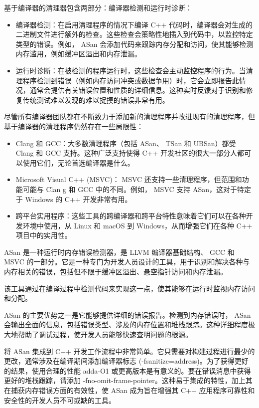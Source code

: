 基于编译器的清理器包含两部分：编译器检测和运行时诊断：

\begin{itemize}
\item
编译器检测：在启用清理程序的情况下编译 C++ 代码时，编译器会对生成的二进制文件进行额外的检查。这些检查会策略性地插入到代码中，以监控特定类型的错误。例如， ASan 会添加代码来跟踪内存分配和访问，使其能够检测内存滥用，例如缓冲区溢出和内存泄漏。

\item
运行时诊断：在被检测的程序运行时，这些检查会主动监控程序的行为。当清理程序检测到错误（例如内存访问冲突或数据争用）时，它会立即报告此情况，通常会提供有关错误位置和性质的详细信息。这种实时反馈对于识别和修复传统测试难以发现的难以捉摸的错误非常有用。
\end{itemize}

尽管所有编译器团队都在不断致力于添加新的清理程序并改进现有的清理程序，但基于编译器的清理程序仍然存在一些局限性：

\begin{itemize}
\item
Clang 和 GCC：大多数清理程序（包括 ASan、 TSan 和 UBSan）都受 Clang 和 GCC 支持。这种广泛支持使得 C++ 开发社区的很大一部分人都可以使用它们，无论首选编译器是什么。

\item
Microsoft Visual C++ (MSVC)： MSVC 还支持一些清理程序，但范围和功能可能与 Clan g 和 GCC 中的不同。例如， MSVC 支持 ASan，这对于特定于 Windows 的 C++ 开发非常有用。

\item
跨平台实用程序：这些工具的跨编译器和跨平台特性意味着它们可以在各种开发环境中使用，从 Linux 和 macOS 到 Windows，从而增强它们在各种 C++ 项目中的实用性。
\end{itemize}


ASan 是一种运行时内存错误检测器，是 LLVM 编译器基础结构、 GCC 和 MSVC 的一部分。它是一种专门为开发人员设计的工具，用于识别和解决各种与内存相关的错误，包括但不限于缓冲区溢出、悬空指针访问和内存泄漏。

该工具通过在编译过程中检测代码来实现这一点，使其能够在运行时监视内存访问和分配。

ASan 的主要优势之一是它能够提供详细的错误报告。检测到内存错误时， ASan 会输出全面的信息，包括错误类型、涉及的内存位置和堆栈跟踪。这种详细程度极大地帮助了调试过程，使开发人员能够快速查明问题的根源。

将 ASan 集成到 C++ 开发工作流程中非常简单。它只需要对构建过程进行最少的更改，通常涉及在编译期间添加编译器标志 (-fsanitize=address)。为了获得更好的结果，使用合理的性能 adda-O1 或更高版本是有意义的。要在错误消息中获得更好的堆栈跟踪，请添加 -fno-omit-frame-pointer。这种易于集成的特性，加上其在捕获内存错误方面的有效性，使 ASan 成为旨在增强其 C++ 应用程序可靠性和安全性的开发人员不可或缺的工具。

